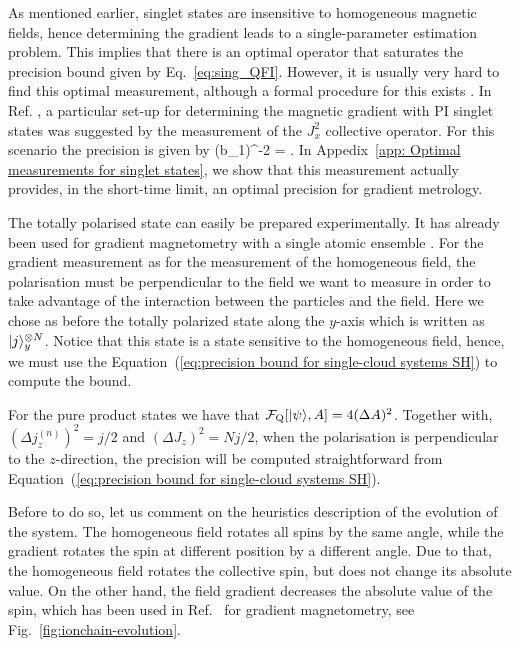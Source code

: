 As mentioned earlier, singlet states are insensitive
to homogeneous magnetic fields,
hence determining the gradient leads to a single-parameter
estimation problem.
This implies that there is an optimal operator that saturates the precision
bound given by Eq.~\eqref{eq:sing_QFI}.
However, it is usually very hard to find
this optimal measurement,
although a formal procedure for this exists \citep{Paris2009}.
In Ref. \citep{Urizar-Lanz2013}, a particular set-up for determining the magnetic gradient
with PI singlet states was suggested by the measurement
of the $J_x^2$ collective operator.
 For this scenario the precision is given by
\be
\label{eq: Jx2_acc}
(\Delta b_1)^{-2}
= .
\ee
In Appedix~\ref{app: Optimal measurements for singlet states},
we  show that this measurement actually provides,
in the short-time limit, an optimal precision for gradient metrology.


The totally polarised state can easily be prepared experimentally.
It has already been used for gradient magnetometry with a single atomic ensemble \citep{Koschorreck2011,Vengalattore2007}.
For the gradient measurement as for the measurement of the homogeneous field, the polarisation must be perpendicular to the field we want to measure in order to take advantage of the interaction between the particles and the field.
Here we chose as before the totally polarized state along the $y$-axis which is written as $\vert j \rangle_y^{\otimes N}$.
Notice that this state is a state sensitive to the homogeneous field, hence, we must use the Equation~(\ref{eq:precision bound for single-cloud systems SH}) to compute the bound.

For the pure product states we have that $\mathcal{F}_{\textnormal{Q}}[{\textstyle \vert \psi \rangle, A}] = 4(\Delta A)^2$.
Together with,
$(\Delta j_z^{(n)})^2=j/2$ and $(\Delta J_z)^2=Nj/2$, when the polarisation is
perpendicular to the $z$-direction, the precision will be computed straightforward from Equation~(\ref{eq:precision bound for single-cloud systems SH}).

Before to do so, let us comment on the heuristics description of the evolution of the system.
The homogeneous field rotates all spins by the same angle, while the gradient rotates the spin at different position by a different angle.
Due to that, the homogeneous field rotates the collective spin, but does not change its absolute value.
On the other hand, the field gradient decreases the absolute value of the spin, which has been used in Ref.~\citep{Behbood2013} for gradient magnetometry, see Fig.~\ref{fig:ionchain-evolution}.

